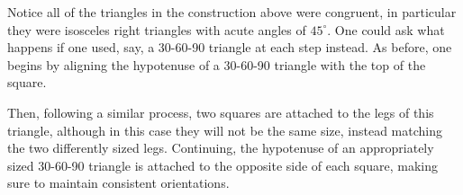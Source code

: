 \documentclass[12 pt]{article}
\begin{document}
\begin{center}
\end{center}
\begin{center}
\end{center}
Notice all of the triangles in the construction above were congruent, in particular they were isosceles right triangles with acute angles of $45^\circ$.  One could ask what happens if one used, say, a 30-60-90 triangle at each step instead.  As before, one begins by aligning the hypotenuse of a 30-60-90 triangle with the top of the square.
\begin{center}
\end{center}
Then, following a similar process, two squares are attached to the legs of this triangle, although in this case they will not be the same size, instead matching the two differently sized legs.  Continuing, the hypotenuse of an appropriately sized 30-60-90 triangle is attached to the opposite side of each square, making sure to maintain consistent orientations.
\end{document}
